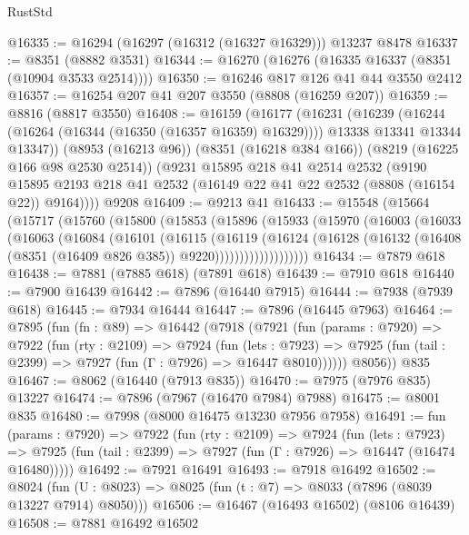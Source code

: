 \begin{lexlean}{RustStd}
\begin{coremodule}
@16335 := @16294 (@16297 (@16312 (@16327 @16329))) @13237 @8478
@16337 := @8351 (@8882 @3531)
@16344 := @16270 (@16276 (@16335 @16337 (@8351 (@10904 @3533 @2514))))
@16350 := @16246 @817 @126 @41 @44 @3550 @2412
@16357 := @16254 @207 @41 @207 @3550 (@8808 (@16259 @207))
@16359 := @8816 (@8817 @3550)
@16408 := @16159
    (@16177
      (@16231
        (@16239
          (@16244 (@16264 (@16344 (@16350 (@16357 @16359) @16329))))
          @13338
          @13341
          @13344
          @13347))
      (@8953 (@16213 @96))
      (@8351 (@16218 @384 @166))
      (@8219 (@16225 @166 @98 @2530 @2514))
      (@9231
        @15895
        @218
        @41
        @2514
        @2532
        (@9190 @15895 @2193 @218 @41 @2532 (@16149 @22 @41 @22 @2532 (@8808 (@16154 @22)) @9164))))
    @9208
@16409 := @9213 @41
@16433 := @15548
    (@15664
      (@15717
        (@15760
          (@15800
            (@15853
              (@15896
                (@15933
                  (@15970
                    (@16003
                      (@16033
                        (@16063
                          (@16084
                            (@16101
                              (@16115
                                (@16119
                                  (@16124
                                    (@16128
                                      (@16132
                                        (@16408 (@8351 (@16409 @826 @385)) @9220)))))))))))))))))))
@16434 := @7879 @618
@16438 := @7881 (@7885 @618) (@7891 @618)
@16439 := @7910 @618
@16440 := @7900 @16439
@16442 := @7896 (@16440 @7915)
@16444 := @7938 (@7939 @618)
@16445 := @7934 @16444
@16447 := @7896 (@16445 @7963)
@16464 := @7895
    (fun (fn : @89) =>
    @16442
      (@7918
        (@7921
          (fun (params : @7920) =>
          @7922
            (fun (rty : @2109) =>
            @7924
              (fun (lets : @7923) =>
              @7925 (fun (tail : @2399) => @7927 (fun (Γ : @7926) => @16447 @8010))))))
        @8056))
    @835
@16467 := @8062 (@16440 (@7913 @835))
@16470 := @7975 (@7976 @835) @13227
@16474 := @7896 (@7967 (@16470 @7984) @7988)
@16475 := @8001 @835
@16480 := @7998 (@8000 @16475 @13230 @7956 @7958)
@16491 := fun (params : @7920) =>
  @7922
    (fun (rty : @2109) =>
    @7924
      (fun (lets : @7923) =>
      @7925 (fun (tail : @2399) => @7927 (fun (Γ : @7926) => @16447 (@16474 @16480)))))
@16492 := @7921 @16491
@16493 := @7918 @16492
@16502 := @8024
    (fun (U : @8023) => @8025 (fun (t : @7) => @8033 (@7896 (@8039 @13227 @7914) @8050)))
@16506 := @16467 (@16493 @16502) (@8106 @16439)
@16508 := @7881 @16492 @16502

\end{coremodule}
\end{lexlean}
